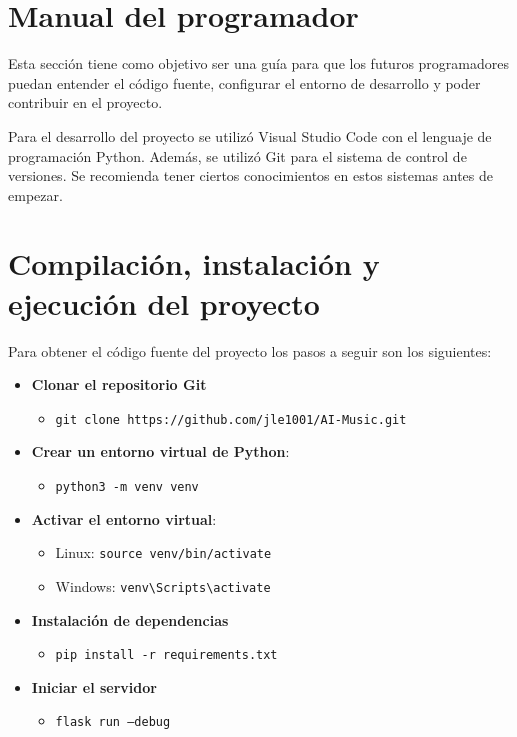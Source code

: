 \section{Manual del programador}

Esta sección tiene como objetivo ser una guía para que los futuros programadores puedan entender el código fuente, configurar el entorno de desarrollo y poder contribuir en el proyecto.

Para el desarrollo del proyecto se utilizó Visual Studio Code con el lenguaje de programación Python. Además, se utilizó Git para el sistema de control de versiones. Se recomienda tener ciertos conocimientos en estos sistemas antes de empezar.

\newpage

\section{Compilación, instalación y ejecución del proyecto}

Para obtener el código fuente del proyecto los pasos a seguir son los siguientes:

\begin{itemize}
\tightlist

\item \textbf{Clonar el repositorio Git}
	\begin{itemize}
	\tightlist
		\item \texttt{git clone https://github.com/jle1001/AI-Music.git}
	\end{itemize}

\item \textbf{Crear un entorno virtual de Python}: 
	\begin{itemize}
	\tightlist
		\item \texttt{python3 -m venv venv}
	\end{itemize}

\item \textbf{Activar el entorno virtual}: 
	\begin{itemize}
		\item Linux: \texttt{source venv/bin/activate}
		
		\item Windows: \texttt{venv\textbackslash Scripts\textbackslash activate}
	\end{itemize}

\item \textbf{Instalación de dependencias}
	\begin{itemize}
	\tightlist
		\item \texttt{pip install -r requirements.txt}
	\end{itemize}

\item \textbf{Iniciar el servidor}
	\begin{itemize}
	\tightlist
		\item \texttt{flask run --debug}
	\end{itemize}
\end{itemize}

